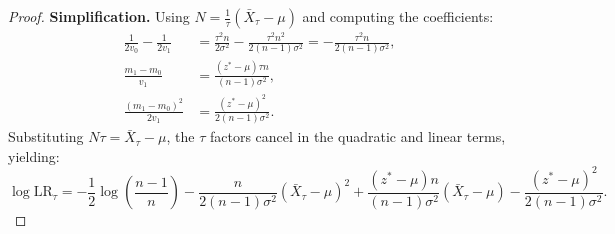 \documentclass[10pt,a4paper]{amsart}
\begin{document}
\begin{proof}
    \textbf{Simplification.}
    Using $N = \frac{1}{\tau}(\bar{X}_\tau - \mu)$ and computing the coefficients:
    \begin{align*}
        \frac{1}{2v_0} - \frac{1}{2v_1} & = \frac{\tau^2 n}{2\sigma^2} - \frac{\tau^2 n^2}{2(n-1)\sigma^2} = -\frac{\tau^2 n}{2(n-1)\sigma^2}, \\
        \frac{m_1-m_0}{v_1}             & = \frac{(z^* - \mu)\tau n}{(n-1)\sigma^2},                                                           \\
        \frac{(m_1-m_0)^2}{2v_1}        & = \frac{(z^* - \mu)^2}{2(n-1)\sigma^2}.
    \end{align*}
    Substituting $N\tau = \bar{X}_\tau - \mu$, the $\tau$ factors cancel in the quadratic and linear terms, yielding:
    \begin{equation*}
        \log \mathrm{LR}_\tau = -\frac{1}{2}\log\left(\frac{n-1}{n}\right) - \frac{n}{2(n-1)\sigma^2}(\bar{X}_\tau - \mu)^2 + \frac{(z^* - \mu)n}{(n-1)\sigma^2}(\bar{X}_\tau - \mu) - \frac{(z^* - \mu)^2}{2(n-1)\sigma^2}.
    \end{equation*}
\end{proof}
\end{document}
